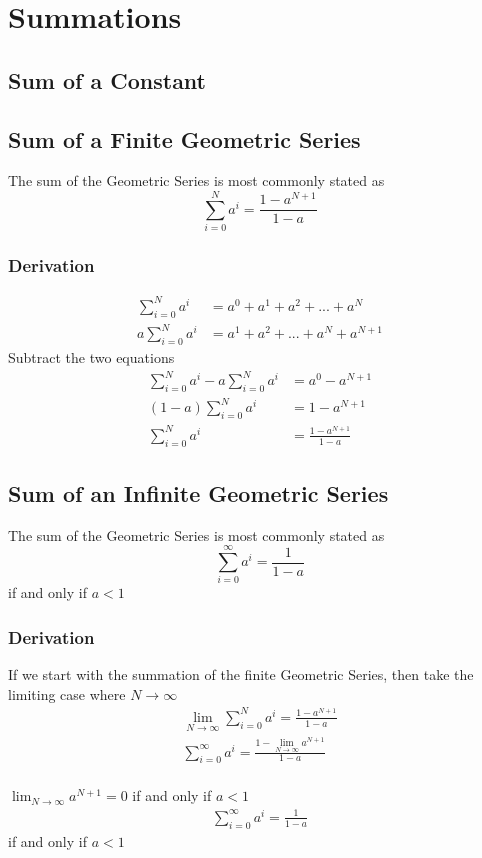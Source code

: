 \documentclass[11pt]{book}
\begin{document}
\chapter{Summations}

\section{Sum of a Constant}

\section{Sum of a Finite Geometric Series}
The sum of the Geometric Series is most commonly stated as
\[ \sum_{i=0}^N{a^i} = \frac{1 - a^{N+1}}{1-a} \]

\subsection{Derivation}
\begin{align*}
\sum_{i=0}^N{a^i} &= a^0 + a^1 + a^2 + ... + a^N  \\
a\sum_{i=0}^N{a^i} &= a^1 + a^2 + ... + a^N + a^{N+1}
\end{align*}
Subtract the two equations
\begin{align*}
\sum_{i=0}^N{a^i} - a\sum_{i=0}^N{a^i} &= a^0 - a^{N+1}  \\
(1-a)\sum_{i=0}^N{a^i} &= 1 - a^{N+1} \\
\sum_{i=0}^N{a^i} &= \frac{1 - a^{N+1}}{1-a}
\end{align*}

\section{Sum of an Infinite Geometric Series}
The sum of the Geometric Series is most commonly stated as
\[ \sum_{i=0}^\infty{a^i} = \frac{1}{1-a} \]
if and only if \(a<1\)

\subsection{Derivation}
If we start with the summation of the finite Geometric Series, then take the limiting case where \(N\to \infty\) \\

\begin{align*}
\lim_{N\to \infty} \sum_{i=0}^N{a^i} = \frac{1 - a^{N+1}}{1-a} \\
\sum_{i=0}^\infty{a^i} = \frac{1 - \lim_{N\to \infty}a^{N+1}}{1-a}
\end{align*}
\\
\(\lim_{ N\to \infty}a^{N+1} =0 \) if and only if \(a<1\) \\
\begin{align*}
\sum_{i=0}^\infty{a^i} = \frac{1}{1-a}
\end{align*}
if and only if \(a<1\)
\end{document}
